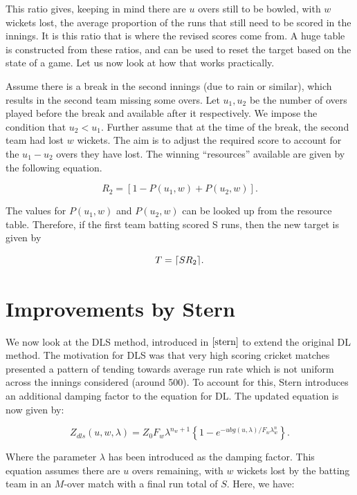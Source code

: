 This ratio gives, keeping in mind there are $u$ overs still to be bowled, with $w$ wickets
lost, the average proportion of the runs that still need to be scored in the innings. 
It is this ratio that is where the revised scores come from. A huge table is constructed from these 
ratios, and can be used to reset the target based on the state of a game. Let us now look at how that works
practically.

\begin{example}
    \label{dlExMain}
    Assume there is a break in the second innings (due to rain or similar), which results in the second team missing some overs.
    Let $u_1, u_2$ be the number of overs played before the break and available after it respectively. We impose the condition
    that $u_2 < u_1$. Further assume that at the time of the break, the second team had lost $w$ wickets. The aim is to adjust the required score to account
    for the $u_1 - u_2$ overs they have lost. The winning ``resources'' available are given by the following equation.

    \[
        R_2 = [1-P(u_1,w)+P(u_2,w)].
    \]  

    The values for $P(u_1,w)$ and $P(u_2,w)$ can be looked up from the resource table.
    Therefore, if the first team batting scored S runs, then the new target is given by

    \[
        T = \lceil SR_2\rceil.
    \]  
\end{example}

\section{Improvements by Stern}
We now look at the DLS method, introduced in $\cite{stern}$ to extend the original DL method. The motivation for DLS was that very high scoring
cricket matches presented a pattern of tending towards average run rate which is not uniform across the innings considered (around 500). To account for 
this, Stern introduces an additional damping factor to the equation for DL. The updated equation is now given by:

\begin{equation}
    Z_{dls}(u,w,\lambda) = Z_0F_w\lambda^{n_w+1} \left\{ 1-e^{-ubg(u,\lambda)/F_w\lambda^n_w} \right\}.
    \label{dls}
\end{equation}

Where the parameter $\lambda$ has been introduced as the damping factor.
This equation assumes there are $u$ overs remaining, with $w$ wickets lost by the batting team in an $M$-over match with a final run total of $S$. Here, we have:

